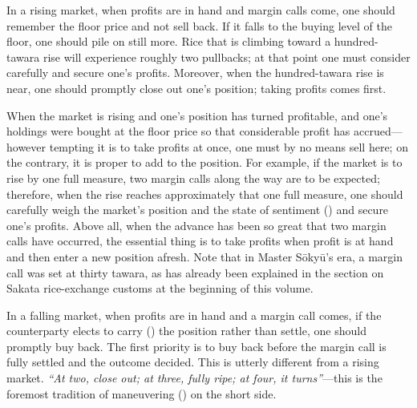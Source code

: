 
\begin{sokyubox}
{\small\itshape\color{sokyubar} }

\medskip
In a rising market, when profits are in hand and margin calls come, one
should remember the floor price and not sell back. If it falls to the
buying level of the floor, one should pile on still more. Rice that is
climbing toward a hundred-tawara rise will experience roughly two
pullbacks; at that point one must consider carefully and secure one's
profits. Moreover, when the hundred-tawara rise is near, one should
promptly close out one's position; taking profits comes first.
\end{sokyubox}

\commentary
When the market is rising and one's position has turned
profitable, and one's holdings were bought at the
floor price so that considerable profit has accrued---however tempting it
is to take profits at once, one must by no means sell here; on the
contrary, it is proper to add to the position. For example, if the
market is to rise by one full measure, two margin calls along the way
are to be expected; therefore, when the rise reaches approximately that
one full measure, one should carefully weigh the market's position and
the state of sentiment () and secure one's profits.
Above all, when the advance has been so great that two margin calls have
occurred, the essential thing is to take profits when profit is at hand
and then enter a new position afresh. Note that in Master S\=oky\=u's
era, a margin call was set at thirty tawara, as has already been
explained in the section on Sakata rice-exchange customs at the
beginning of this volume.


\begin{sokyubox}
{\small\itshape\color{sokyubar} }

\medskip
In a falling market, when profits are in hand and a margin call comes,
if the counterparty elects to carry () the position
rather than settle, one should promptly buy back. The first priority is
to buy back before the margin call is fully settled and the outcome
decided. This is utterly different from a rising market.
\textit{``At two, close out; at three, fully ripe; at four, it
turns''}---this is the foremost tradition of maneuvering
() on the short side.
\end{sokyubox}

